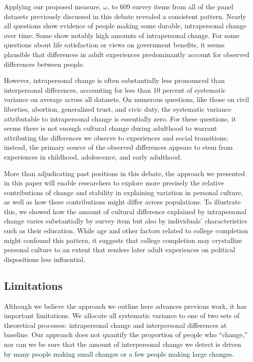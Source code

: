 \documentclass[
  12pt,
]{article}
\begin{document}
Applying our proposed measure, \(\omega\), to 609 survey items from all
of the panel datasets previously discussed in this debate revealed a
consistent pattern. Nearly all questions show evidence of people making
some durable, intrapersonal change over time. Some show notably high
amounts of intrapersonal change. For some questions about life
satisfaction or views on government benefits, it seems plausible that
differences in adult experiences predominantly account for observed
differences between people.

However, intrapersonal change is often substantially less pronounced
than interpersonal differences, accounting for less than 10 percent of
systematic variance on average across all datasets. On numerous
questions, like those on civil liberties, abortion, generalized trust,
and civic duty, the systematic variance attributable to intrapersonal
change is essentially zero. For these questions, it seems there is not
enough cultural change during adulthood to warrant attributing the
differences we observe to experiences and social transitions; instead,
the primary source of the observed differences appears to stem from
experiences in childhood, adolescence, and early adulthood.

More than adjudicating past positions in this debate, the approach we
presented in this paper will enable researchers to explore more
precisely the relative contributions of change and stability in
explaining variation in personal culture, as well as how these
contributions might differ across populations. To illustrate this, we
showed how the amount of cultural difference explained by intrapersonal
change varies substantially by survey item but also by individuals'
characteristics such as their education. While age and other factors
related to college completion might confound this pattern, it suggests
that college completion may crystallize personal culture to an extent
that renders later adult experiences on political dispositions less
influential.

\hypertarget{limitations}{%
\subsection{Limitations}\label{limitations}}

Although we believe the approach we outline here advances previous work,
it has important limitations. We allocate all systematic variance to one
of two sets of theoretical processes: intrapersonal change and
interpersonal differences at baseline. Our approach does not quantify
the proportion of people who ``change,'' nor can we be sure that the
amount of interpersonal change we detect is driven by many people making
small changes or a few people making large changes.
\end{document}
